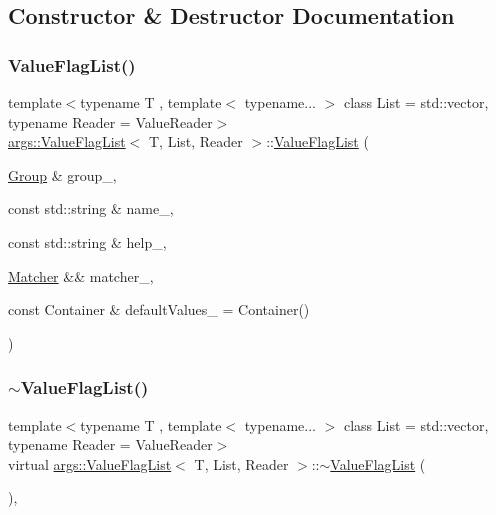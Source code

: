 \subsection{Constructor \& Destructor Documentation}
\mbox{\label{classargs_1_1_value_flag_list_a8f07c17af44a077028bb71a6ac5b1660}} 
\subsubsection{\texorpdfstring{Value\+Flag\+List()}{ValueFlagList()}}
{\footnotesize\ttfamily template$<$typename T , template$<$ typename... $>$ class List = std\+::vector, typename Reader  = Value\+Reader$>$ \\
\hyperlink{classargs_1_1_value_flag_list}{args\+::\+Value\+Flag\+List}$<$ T, List, Reader $>$\+::\hyperlink{classargs_1_1_value_flag_list}{Value\+Flag\+List} (\begin{DoxyParamCaption}\item[{\hyperlink{classargs_1_1_group}{Group} \&}]{group\+\_\+,  }\item[{const std\+::string \&}]{name\+\_\+,  }\item[{const std\+::string \&}]{help\+\_\+,  }\item[{\hyperlink{classargs_1_1_matcher}{Matcher} \&\&}]{matcher\+\_\+,  }\item[{const Container \&}]{default\+Values\+\_\+ = {\ttfamily Container()} }\end{DoxyParamCaption})\hspace{0.3cm}{\ttfamily [inline]}}

\mbox{\label{classargs_1_1_value_flag_list_a5d3c39a9b0f36c94938760d4f93d5949}} 
\subsubsection{\texorpdfstring{$\sim$\+Value\+Flag\+List()}{~ValueFlagList()}}
{\footnotesize\ttfamily template$<$typename T , template$<$ typename... $>$ class List = std\+::vector, typename Reader  = Value\+Reader$>$ \\
virtual \hyperlink{classargs_1_1_value_flag_list}{args\+::\+Value\+Flag\+List}$<$ T, List, Reader $>$\+::$\sim$\hyperlink{classargs_1_1_value_flag_list}{Value\+Flag\+List} (\begin{DoxyParamCaption}{ }\end{DoxyParamCaption})\hspace{0.3cm}{\ttfamily [inline]}, {\ttfamily [virtual]}}



